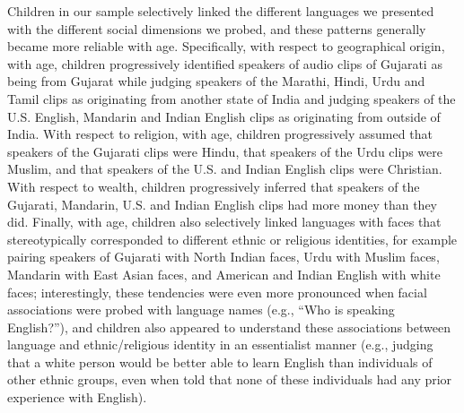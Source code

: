 \documentclass{foushee-adapted-preprint}
\begin{document}
Children in our sample selectively linked the different languages we presented with the different social dimensions we probed, and these patterns generally became more reliable with age. Specifically, with respect to geographical origin, with age, children progressively identified speakers of audio clips of Gujarati as being from Gujarat while judging speakers of the Marathi, Hindi, Urdu and Tamil clips as originating from another state of India and judging speakers of the U.S. English, Mandarin and Indian English clips as originating from outside of India. With respect to religion, with age, children progressively assumed that speakers of the Gujarati clips were Hindu, that speakers of the Urdu clips were Muslim, and that speakers of the U.S. and Indian English clips were Christian. With respect to wealth, children progressively inferred that speakers of the Gujarati, Mandarin, U.S. and Indian English clips had more money than they did. Finally, with age, children also selectively linked languages with faces that stereotypically corresponded to different ethnic or religious identities, for example pairing speakers of Gujarati with North Indian faces, Urdu with Muslim faces, Mandarin with East Asian faces, and American and Indian English with white faces; interestingly, these tendencies were even more pronounced when facial associations were probed with language names (e.g., ``Who is speaking English?''), and children also appeared to understand these associations between language and ethnic/religious identity in an essentialist manner (e.g., judging that a white person would be better able to learn English than individuals of other ethnic groups, even when told that none of these individuals had any prior experience with English). 
\end{document}
